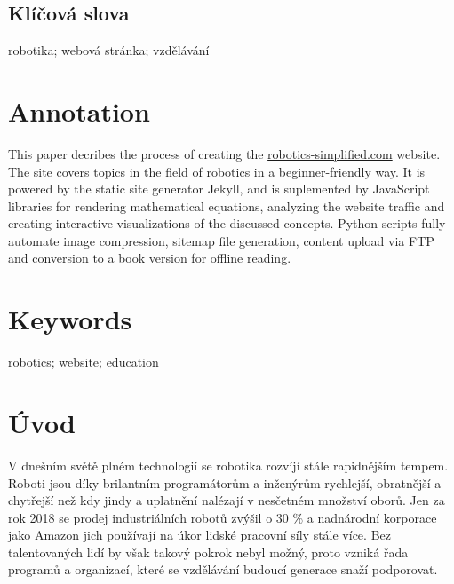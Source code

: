 \documentclass[a4paper, 12pt]{article}
\begin{document}
  \subsection*{\fontsize{18}{21.6}\selectfont\normalfont\textbf{Klíčová slova}}
  robotika; webová stránka; vzdělávání

  \section*{\normalfont\textbf{Annotation}}
  This paper decribes the process of creating the \url{robotics-simplified.com} website. The site covers topics in the field of robotics in a beginner-friendly way. It is powered by the static site generator Jekyll, and is suplemented by JavaScript libraries for rendering mathematical equations, analyzing the website traffic and creating interactive visualizations of the discussed concepts. Python scripts fully automate image compression, sitemap file generation, content upload via FTP and conversion to a book version for offline reading.

  \section*{\normalfont\textbf{Keywords}}
  robotics; website; education

  \newpage

  \setcounter{savepage}{\value{page}}%

  \renewcommand{\contentsname}{Obsah}
  \tableofcontents

  \newpage

  \section{Úvod}
  V dnešním světě plném technologií se robotika rozvíjí stále rapidnějším tempem. Roboti jsou díky brilantním programátorům a inženýrům rychlejší, obratnější a chytřejší než kdy jindy a uplatnění nalézají v nesčetném množství oborů. Jen za rok 2018 se prodej industriálních robotů zvýšil o 30 \%\cite{industrial-robot-growth} a nadnárodní korporace jako Amazon jich používají na úkor lidské pracovní síly stále více\cite{amazon-hiring}. Bez talentovaných lidí by však takový pokrok nebyl možný, proto vzniká řada programů a organizací, které se vzdělávání budoucí generace snaží podporovat.
\end{document}
